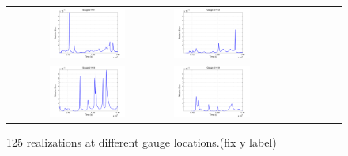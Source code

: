\begin{figure}[h]
\centering
\begin{tabular}{clc}        
\includegraphics[width=0.5\textwidth]{./figures/error_gauge1.pdf} &
\includegraphics[width=0.5\textwidth]{./figures/error_gauge2.pdf} \\
\includegraphics[width=0.5\textwidth]{./figures/error_gauge3.pdf} &
\includegraphics[width=0.5\textwidth]{./figures/error_gauge4.pdf} 

\end{tabular}
\caption{125 \geoclaw realizations at different gauge locations.(fix y label)}
\label{fig:error}
\end{figure}   
